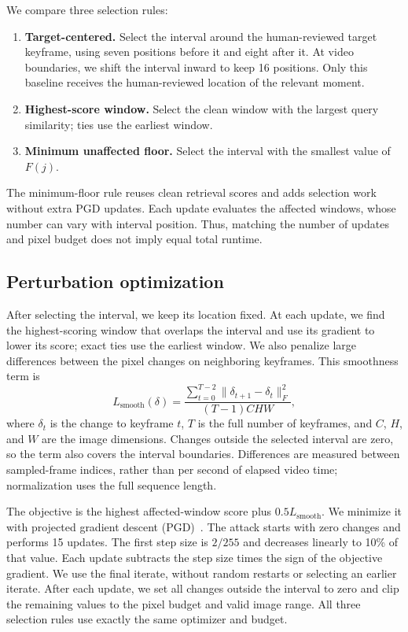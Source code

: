 \documentclass[runningheads]{llncs}
\begin{document}
We compare three selection rules:
\begin{enumerate}
\item \textbf{Target-centered.} Select the interval around the human-reviewed target keyframe, using seven positions before it and eight after it. At video boundaries, we shift the interval inward to keep 16 positions. Only this baseline receives the human-reviewed location of the relevant moment.
\item \textbf{Highest-score window.} Select the clean window with the largest query similarity; ties use the earliest window.
\item \textbf{Minimum unaffected floor.} Select the interval with the smallest value of $F(j)$.
\end{enumerate}

The minimum-floor rule reuses clean retrieval scores and adds selection work without extra PGD updates. Each update evaluates the affected windows, whose number can vary with interval position. Thus, matching the number of updates and pixel budget does not imply equal total runtime.

\subsection{Perturbation optimization}

After selecting the interval, we keep its location fixed. At each update, we find the highest-scoring window that overlaps the interval and use its gradient to lower its score; exact ties use the earliest window. We also penalize large differences between the pixel changes on neighboring keyframes. This smoothness term is
\begin{equation}
L_{\mathrm{smooth}}(\delta)=
\frac{\sum_{t=0}^{T-2}\|\delta_{t+1}-\delta_t\|_F^2}{(T-1)CHW},
\end{equation}
where $\delta_t$ is the change to keyframe $t$, $T$ is the full number of keyframes, and $C$, $H$, and $W$ are the image dimensions. Changes outside the selected interval are zero, so the term also covers the interval boundaries. Differences are measured between sampled-frame indices, rather than per second of elapsed video time; normalization uses the full sequence length.

The objective is the highest affected-window score plus $0.5L_{\mathrm{smooth}}$. We minimize it with projected gradient descent (PGD)~\cite{madry2018pgd}. The attack starts with zero changes and performs 15 updates. The first step size is $2/255$ and decreases linearly to 10\% of that value. Each update subtracts the step size times the sign of the objective gradient. We use the final iterate, without random restarts or selecting an earlier iterate. After each update, we set all changes outside the interval to zero and clip the remaining values to the pixel budget and valid image range. All three selection rules use exactly the same optimizer and budget.
\end{document}
